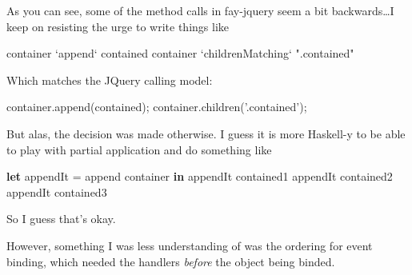 \documentclass[]{article}
\newenvironment{Shaded}{}{}
\newcommand{\KeywordTok}[1]{\textcolor[rgb]{0.00,0.44,0.13}{\textbf{{#1}}}}
\newcommand{\DataTypeTok}[1]{\textcolor[rgb]{0.56,0.13,0.00}{{#1}}}
\newcommand{\StringTok}[1]{\textcolor[rgb]{0.25,0.44,0.63}{{#1}}}
\newcommand{\CommentTok}[1]{\textcolor[rgb]{0.38,0.63,0.69}{\textit{{#1}}}}
\newcommand{\OtherTok}[1]{\textcolor[rgb]{0.00,0.44,0.13}{{#1}}}
\newcommand{\FunctionTok}[1]{\textcolor[rgb]{0.02,0.16,0.49}{{#1}}}
\newcommand{\VariableTok}[1]{\textcolor[rgb]{0.10,0.09,0.49}{{#1}}}
\newcommand{\OperatorTok}[1]{\textcolor[rgb]{0.40,0.40,0.40}{{#1}}}
\newcommand{\AttributeTok}[1]{\textcolor[rgb]{0.49,0.56,0.16}{{#1}}}
\newcommand{\NormalTok}[1]{{#1}}
\begin{document}
As you can see, some of the method calls in fay-jquery seem a bit
backwards\ldots{}I keep on resisting the urge to write things like

\begin{Shaded}
\begin{Highlighting}[]
\NormalTok{container }\OtherTok{`append`} \NormalTok{contained}
\NormalTok{container }\OtherTok{`childrenMatching`} \StringTok{".contained"}
\end{Highlighting}
\end{Shaded}

Which matches the JQuery calling model:

\begin{Shaded}
\begin{Highlighting}[]
\VariableTok{container}\NormalTok{.}\AttributeTok{append}\NormalTok{(contained)}\OperatorTok{;}
\VariableTok{container}\NormalTok{.}\AttributeTok{children}\NormalTok{(}\StringTok{'.contained'}\NormalTok{)}\OperatorTok{;}
\end{Highlighting}
\end{Shaded}

But alas, the decision was made otherwise. I guess it is more Haskell-y to be
able to play with partial application and do something like

\begin{Shaded}
\begin{Highlighting}[]
\KeywordTok{let}
  \NormalTok{appendIt }\FunctionTok{=} \NormalTok{append container}
\KeywordTok{in}
  \NormalTok{appendIt contained1}
  \NormalTok{appendIt contained2}
  \NormalTok{appendIt contained3}
\end{Highlighting}
\end{Shaded}

So I guess that's okay.

However, something I was less understanding of was the ordering for event
binding, which needed the handlers \emph{before} the object being binded.

\begin{Shaded}
\end{Shaded}
\end{document}
